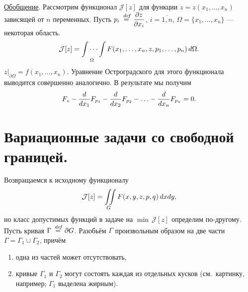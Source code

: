 \documentclass[12pt,a4paper,openany,fleqn]{book}
\newcommand {\defeq}{\stackrel{\hspace{0.09 cm}de\!f}{=}}
\newcommand {\eqdef}{\defeq}
\newcommand{\J}{\ensuremath{\mathcal{J}}}
\newcommand{\der}[2]{\ensuremath{\frac{d#1}{d#2}}}
\newcommand{\pder}[2]{\ensuremath{\frac{\partial#1}{\partial#2}}}
\theoremstyle{definition}
\begin{document}
	\noindent\underline{Обобщение}. Рассмотрим функционал $\J[z]$ для функции $z=z(x_1,\ldots,x_n)$ зависящей от $n$ переменных. Пусть $\displaystyle p_i\eqdef\pder{z}{x_i}$, $i=\overline{1,n}$, $\Omega=\{x_1,\ldots,x_n\}$ --- некоторая область.
	\begin{equation*}
		\hfill\J[z]=\idotsint\limits_{\Omega}F(x_1,\ldots,x_n,z,p_1,\ldots,p_n)\,d\Omega.\hfill
	\end{equation*}
	$z\Big|_{\partial\Omega}=f(x_1,\ldots,x_n)$. Уравнение Остроградского для этого функционала выводится совершенно аналогично. В результате мы получим 
	\begin{equation*}
		\hfill F_z-\der{}{x_1}F_{p_1}-\der{}{x_2}F_{p_2}-\ldots-\der{}{x_n}F_{p_n}=0.\hfill
	\end{equation*}
	\section{Вариационные задачи со свободной границей.}
	\label{lecture9section3}
	Возвращаемся к исходному функционалу
	\begin{equation*}
		\hfill\J[z]=\iint\limits_{G}F(x,y,z,p,q)\,dxdy,\hfill
	\end{equation*}
	но класс допустимых функций в задаче на $\min\,\J[z]$ определим по-другому. Пусть кривая $\Gamma\eqdef\partial G$. Разобьём $\Gamma$ произвольным образом на две части $\Gamma=\Gamma_1\cup \Gamma_2$, причём 
	\begin{enumerate}
		\item одна из частей может отсутствовать,
		\item кривые $\Gamma_1$ и $\Gamma_2$ могут состоять каждая из отдельных кусков (см.~картинку, например; $\Gamma_1$ выделена жирным).
	\end{enumerate} 
	
	
\end{document}
